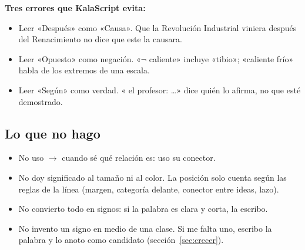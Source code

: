 \textbf{Tres errores que KalaScript evita:}
\begin{itemize}
\item Leer «Después» como «Causa». Que la Revolución Industrial viniera después
 del Renacimiento no dice que este la causara.
\item Leer «Opuesto» como negación. «\(\neg\) caliente» incluye «tibio»;
 «caliente  frío» habla de los extremos de una escala.
\item Leer «Según» como verdad. « el profesor: \ldots» dice quién lo
 afirma, no que esté demostrado.
\end{itemize}

\subsection{Lo que no hago}
\begin{itemize}
\item No uso \(\to\) cuando sé qué relación es: uso su conector.
\item No doy significado al tamaño ni al color. La posición solo cuenta según
 las reglas de la línea (margen, categoría delante, conector entre ideas, lazo).
\item No convierto todo en signos: si la palabra es clara y corta, la escribo.
\item No invento un signo en medio de una clase. Si me falta uno, escribo la
 palabra y lo anoto como candidato (sección~\ref{sec:crecer}).
\end{itemize}
